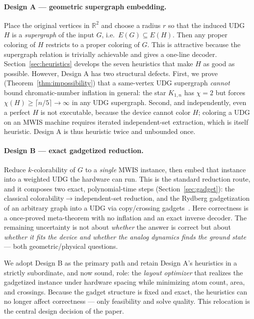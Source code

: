 \documentclass[11pt]{article}
\theoremstyle{definition}
\theoremstyle{remark}
\newcommand{\R}{\mathbb{R}}
\begin{document}
\paragraph{Design A --- geometric supergraph embedding.} Place the original vertices
in $\R^2$ and choose a radius $r$ so that the induced UDG $H$ is a \emph{supergraph}
of the input $G$, i.e.\ $E(G)\subseteq E(H)$. Then any proper coloring of $H$
restricts to a proper coloring of $G$. This is attractive because the supergraph
relation is trivially achievable and gives a one-line decoder.
Section~\ref{sec:heuristics} develops the seven heuristics that make $H$ as good as
possible. However, Design A has two structural defects. First, we prove
(Theorem~\ref{thm:impossibility}) that a same-vertex UDG supergraph \emph{cannot}
bound chromatic-number inflation in general: the star $K_{1,n}$ has $\chi = 2$ but
forces $\chi(H)\ge\lceil n/5\rceil\to\infty$ in any UDG supergraph. Second, and
independently, even a perfect $H$ is not executable, because the device cannot color
$H$; coloring a UDG on an MWIS machine requires iterated independent-set extraction,
which is itself heuristic. Design A is thus heuristic twice and unbounded once.

\paragraph{Design B --- exact gadgetized reduction.} Reduce $k$-colorability of $G$ to
a \emph{single} MWIS instance, then embed that instance into a weighted UDG the
hardware can run. This is the standard reduction route, and it composes two exact,
polynomial-time steps (Section~\ref{sec:gadget}): the classical
colorability$\to$independent-set reduction, and the Rydberg gadgetization of an
arbitrary graph into a UDG via copy/crossing gadgets~\cite{Nguyen2023}. Here
correctness is a once-proved meta-theorem with no inflation and an exact inverse
decoder. The remaining uncertainty is not about \emph{whether} the answer is correct
but about \emph{whether it fits the device and whether the analog dynamics finds the
ground state} --- both geometric/physical questions.

We adopt Design B as the primary path and retain Design A's heuristics in a strictly
subordinate, and now sound, role: the \emph{layout optimizer} that realizes the
gadgetized instance under hardware spacing while minimizing atom count, area, and
crossings. Because the gadget structure is fixed and exact, the heuristics can no
longer affect correctness --- only feasibility and solve quality. This relocation is
the central design decision of the paper.
\end{document}
